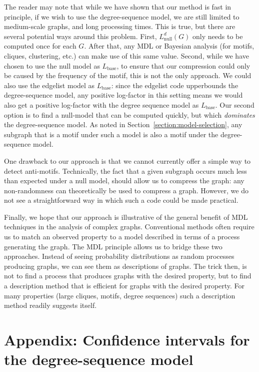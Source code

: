 The reader may note that while we have shown that our method is fast in principle, if we wish to use the degree-sequence model, we are still limited to medium-scale graphs, and long processing times. This is true, but there are several potential ways around this problem. First, $L^d_\text{null}(G)$ only needs to be computed once for each $G$. After that, any MDL or Bayesian analysis (for motifs, cliques, clustering, etc.) can make use of this same value. Second, while we have chosen to use the null model as $L_\text{base}$, to ensure that our compression could only be caused by the frequency of the motif, this is not the only approach. We could also use the edgelist model as $L_\text{base}$: since the edgelist code upperbounds the degree-sequence model, any positive log-factor in this setting means we would also get a positive log-factor with the degree sequence model as $L_\text{base}$. Our second option is to find a null-model that can be computed quickly, but which \emph{dominates} the degree-sequence model. As noted in Section~\ref{section:model-selection}, any subgraph that is a motif under such a model is also a motif under the degree-sequence model. 


One drawback to our approach is that we cannot currently offer a simple way to detect anti-motifs. Technically, the fact that a given subgraph occurs much less than expected under a null model, should allow us to compress the graph: any non-randomness can theoretically be used to compress a graph. However, we do not see a straightforward way in which such a code could be made practical. 

Finally, we hope that our approach is illustrative of the general benefit of MDL techniques in the analysis of complex graphs. Conventional methods often require us to match an observed property to a model described in terms of a process generating the graph. The MDL principle allows us to  bridge these two approaches. Instead of seeing probability distributions as random processes producing graphs, we can see them as descriptions of graphs. The trick then, is not to find a process that produces graphs with the desired property, but to find a description method that is efficient for graphs with the desired property. For many properties (large cliques, motifs, degree sequences) such a description method readily suggests itself. 

\section{Appendix: Confidence intervals for the degree-sequence model}
\label{section:confidence-intervals}

